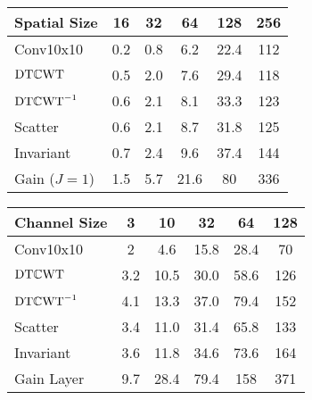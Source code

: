 \begin{table}[bt]
  \renewcommand{\arraystretch}{1.2}
  \centering
  \label{tab:appA:spatial}
  \begin{tabular}{@{}l ccccc@{}}
    \toprule
    Spatial Size & 16 & 32 & 64 & 128 & 256 \\
    \midrule
    Conv10x10 & 0.2 & 0.8 & 6.2 & 22.4 & 112 \\
    $\mathrm{DT}\mathbb{C}\mathrm{WT}$ & 0.5 & 2.0 & 7.6 & 29.4 & 118 \\
    $\mathrm{DT}\mathbb{C}\mathrm{WT}^{-1}$ & 0.6 & 2.1 & 8.1 & 33.3 & 123\\
    Scatter & 0.6 & 2.1 & 8.7 & 31.8 & 125 \\
    Invariant & 0.7 & 2.4 & 9.6 & 37.4 & 144 \\
    Gain ($J=1$) & 1.5 & 5.7 & 21.6 & 80 &  336 \\
    \bottomrule
  \end{tabular}
\end{table}
\begin{table}[t]
  \renewcommand{\arraystretch}{1.2}
  \centering
  \label{tab:appA:channel}
  \begin{tabular}{@{}l ccccc@{}}
    \toprule
    Channel Size & 3 & 10 & 32 & 64 & 128 \\
    \midrule
    Conv10x10 & 2 & 4.6 & 15.8 & 28.4 & 70 \\
    $\mathrm{DT}\mathbb{C}\mathrm{WT}$ & 3.2 & 10.5 & 30.0 & 58.6 & 126 \\
    $\mathrm{DT}\mathbb{C}\mathrm{WT}^{-1}$ & 4.1 & 13.3 & 37.0 & 79.4 & 152 \\
    Scatter & 3.4 & 11.0 & 31.4 & 65.8 & 133 \\
    Invariant & 3.6 & 11.8 & 34.6 & 73.6 & 164 \\
    Gain Layer & 9.7 & 28.4 & 79.4 & 158 & 371 \\
    \bottomrule
  \end{tabular}
\end{table}
